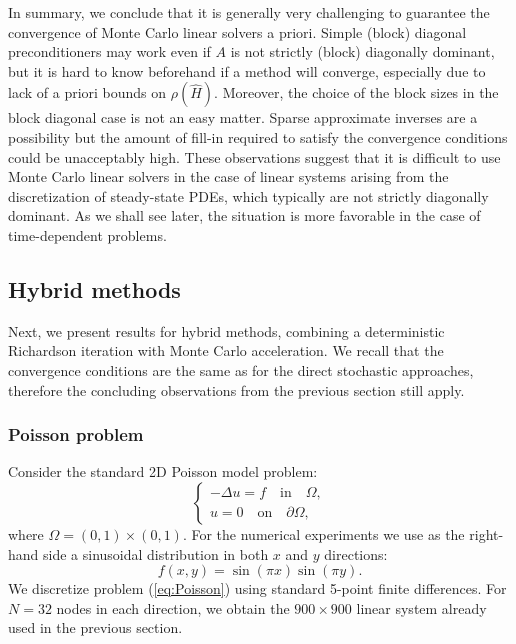 \documentclass[times]{nlaauth}
\begin{document}
In summary, we conclude that it is generally very challenging to guarantee
the convergence of Monte Carlo linear solvers a priori. Simple (block) diagonal
preconditioners may work even if $A$ is not strictly (block)
diagonally dominant, but it is hard to know beforehand if a method will converge,
especially due to lack of a priori bounds on $\rho(\hat{H})$.
Moreover, the choice of the block sizes in the block diagonal case
is not an easy matter. Sparse approximate inverses are a possibility
but the amount of fill-in required to satisfy the
convergence conditions could be unacceptably high. These observations
suggest that it is difficult to use Monte Carlo linear solvers in the
case of linear systems arising from the discretization of steady-state
PDEs, which typically are not strictly diagonally dominant.
As we shall see later, the situation is more favorable in the case of
time-dependent problems.

\subsection{Hybrid methods}
Next, we present results for hybrid methods, combining a deterministic
Richardson iteration with Monte Carlo acceleration. We recall that the
convergence conditions are the same as for the direct stochastic
approaches, therefore the concluding observations from the previous section
still apply.

\subsubsection{Poisson problem}

Consider the standard 2D Poisson model problem:
\begin{equation}
\begin{cases}
 -\Delta u = f \quad \text{in}\quad \Omega, \\
 u=0\quad \text{on} \quad \partial\Omega ,
 \end{cases}
\label{eq:Poisson}
\end{equation}
where $\Omega=(0,1)\times (0,1)$. %
For the numerical experiments we use as the right-hand side
a sinusoidal distribution in both $x$ and $y$ directions:
\[
 f(x, y)=\sin ({\pi x})\sin ({\pi y}).
\]
We discretize problem (\ref{eq:Poisson}) using standard 5-point finite
differences. For $N=32$ nodes in each direction, we obtain the $900\times 900$
linear system already used in the previous section.
\end{document}
